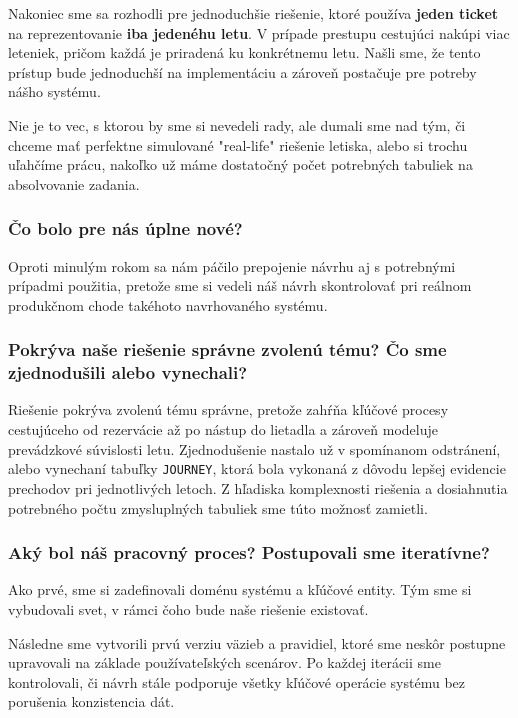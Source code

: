 \documentclass[11pt, a4paper]{article}
\begin{document}
Nakoniec sme sa rozhodli pre jednoduchšie riešenie, ktoré používa \textbf{jeden ticket} na reprezentovanie \textbf{iba jedenéhu letu}. V prípade prestupu cestujúci nakúpi viac leteniek, pričom každá je priradená ku konkrétnemu letu. Našli sme, že tento prístup bude jednoduchší na implementáciu a zároveň postačuje pre potreby nášho systému.

Nie je to vec, s ktorou by sme si nevedeli rady, ale dumali sme nad tým, či chceme mať perfektne simulované "real-life" riešenie letiska, alebo si trochu uľahčíme prácu, nakoľko už máme dostatočný počet potrebných tabuliek na absolvovanie zadania.

\subsubsection*{Čo bolo pre nás úplne nové?}

Oproti minulým rokom sa nám páčilo prepojenie návrhu aj s potrebnými prípadmi použitia, pretože sme si vedeli náš návrh skontrolovať pri reálnom produkčnom chode takéhoto navrhovaného systému. 

\subsubsection*{Pokrýva naše riešenie správne zvolenú tému? Čo sme zjednodušili alebo vynechali?}

Riešenie pokrýva zvolenú tému správne, pretože zahŕňa kľúčové procesy
cestujúceho od rezervácie až po nástup do lietadla a zároveň modeluje
prevádzkové súvislosti letu. 
Zjednodušenie nastalo už v spomínanom odstránení, alebo vynechaní tabuľky \texttt{JOURNEY}, ktorá bola vykonaná z dôvodu lepšej evidencie prechodov pri jednotlivých letoch. Z hľadiska komplexnosti riešenia a dosiahnutia potrebného počtu zmysluplných tabuliek sme túto možnosť zamietli.

\subsubsection*{Aký bol náš pracovný proces? Postupovali sme iteratívne?}

Ako prvé, sme si zadefinovali doménu systému a kľúčové entity. 
Tým sme si vybudovali svet, v rámci čoho bude naše riešenie existovať.

Následne sme vytvorili prvú verziu väzieb a pravidiel, ktoré sme neskôr postupne upravovali na základe používateľských scenárov. 
Po každej iterácii sme kontrolovali, či návrh stále podporuje všetky kľúčové operácie systému bez porušenia konzistencia dát.
\end{document}
